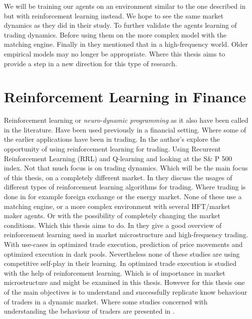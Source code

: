 \documentclass{kththesis}
\theoremstyle{definition}
\begin{document}
\newpage
We will be training our agents on an environment similar to the one described in \parencite{das2005learning} but with reinforcement learning instead. We hope to see the same market dynamics as they did in their study. To further validate the agents learning of trading dynamics. Before using them on the more complex model with the matching engine. Finally in \textcite{o2015high} they mentioned that in a high-frequency world. Older empirical models may no longer be appropriate. Where this thesis aims to provide a step in a new direction for this type of research.

\section{Reinforcement Learning in Finance}

Reinforcement learning or \textit{neuro-dynamic programming} as it also have been called in the literature. Have been used previously in a financial setting. Where some of the earlier applications have been in trading. In \textcite{moody1999reinforcement} the author's explore the opportunity of using reinforcement learning for trading. Using Recurrent Reinforcement Learning (RRL) and Q-learning and looking at the S\& P 500 index. Not that much focus is on trading dynamics. Which will be the main focus of  this thesis, on a completely different market. In \parencite{dempster2006automated, du2016algorithm, wang2016reinforcement, casqueiro2006neuro, bertoluzzo2012testing} they discuss the usages of different types of reinforcement learning algorithms for trading. Where trading is done in for example foreign exchange or the energy market. None of these use a matching engine, or a more complex environment with several HFT/market maker agents. Or with the possibility of completely changing the market conditions. Which this thesis aims to do. 
\newline
\newline
In \textcite{kearns2013machine} they give a good overview of reinforcement learning used in market microstructure and high-frequency trading. With use-cases in optimized trade execution, prediction of price movements and optimized execution in dark pools. Nevertheless none of these studies are using competitive self-play in their learning. In \parencite{nevmyvaka2006reinforcement, hendricks2014reinforcement}  optimized trade execution is studied with the help of reinforcement learning. Which is of importance in market microstructure and might be examined in this thesis. However for this thesis one of the main objectives is to understand and successfully replicate know behaviour of traders in a dynamic market. Where some studies concerned with understanding the behaviour of traders are presented in \parencite{yang2014algorithmic, yang2012behavior}. 
\end{document}

